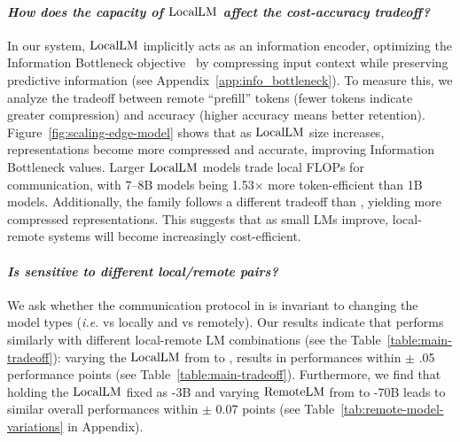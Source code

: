 \vspace{-0.75em}\paragraph{\textit{How does the capacity of $\mathrm{LocalLM}$ affect the cost-accuracy tradeoff?}}
In our system, $\mathrm{LocalLM}$ implicitly acts as an information encoder, optimizing the Information Bottleneck objective~\citep{tishby2000information} by compressing input context while preserving predictive information (see Appendix~\ref{app:info_bottleneck}). To measure this, we analyze the tradeoff between remote ``prefill'' tokens (fewer tokens indicate greater compression) and accuracy (higher accuracy means better retention). Figure~\ref{fig:scaling-edge-model} shows that as $\mathrm{LocalLM}$ size increases, representations become more compressed and accurate, improving Information Bottleneck values. Larger $\mathrm{LocalLM}$ models trade local FLOPs for communication, with 7–8B models being 1.53× more token-efficient than 1B models. Additionally, the \qwen family follows a different tradeoff than \llama, yielding more compressed representations. This suggests that as small LMs improve, local-remote systems will become increasingly cost-efficient.



\vspace{-0.75em}\paragraph{\textit{Is \system sensitive to different local/remote pairs?}} 
We ask whether the communication protocol in \system is invariant to changing the model types (\textit{i.e.} \llama vs \qwen locally and \llama vs \gpt remotely). Our results indicate that \system performs similarly with different local-remote LM combinations (see the Table~\ref{table:main-tradeoff}): varying the $\mathrm{LocalLM}$ from \qwen to \llamathreetwo, results in performances within $\pm$ .05 performance points (see Table~\ref{table:main-tradeoff}). Furthermore, we find that holding the $\mathrm{LocalLM}$ fixed as \llamathreetwo-3B and varying $\mathrm{RemoteLM}$ from \gpt to -70B leads to similar overall performances within $\pm$ 0.07 points (see Table~\ref{tab:remote-model-variations} in Appendix).

